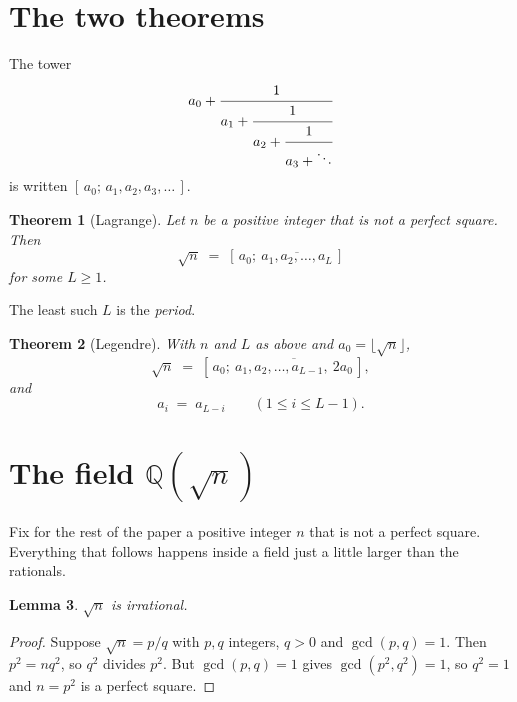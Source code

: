 \documentclass[12pt,a4paper]{article}
\theoremstyle{plain}
\newtheorem{theorem}{Theorem}
\newtheorem{lemma}[theorem]{Lemma}
\theoremstyle{definition}
\begin{document}
\clearpage
\section{The two theorems}

The tower
\[
  a_0 + \cfrac{1}{a_1 + \cfrac{1}{a_2 + \cfrac{1}{a_3 + \ddots}}}
\]
is written $[\,a_0;\, a_1, a_2, a_3, \ldots\,]$.

\begin{center}
\colorbox{yellow!25}{%
\begin{minipage}{0.93\textwidth}
\begin{theorem}[Lagrange]\label{periodic}
Let $n$ be a positive integer that is not a perfect square. Then
\[
  \sqrt n \;=\; [\,a_0;\ \overline{a_1, a_2, \ldots, a_L}\,]
\]
for some $L \geq 1$.
\end{theorem}
\end{minipage}}
\end{center}

The least such $L$ is the \emph{period}.

\begin{center}
\colorbox{yellow!25}{%
\begin{minipage}{0.93\textwidth}
\begin{theorem}[Legendre]\label{main}
With $n$ and $L$ as above and $a_0 = \lfloor\sqrt n\rfloor$,
\[
  \sqrt n \;=\; [\,a_0;\ \overline{a_1, a_2, \ldots, a_{L-1},\ 2a_0}\,],
\]
and
\[
  a_i \;=\; a_{L-i} \qquad (1 \leq i \leq L-1).
\]
\end{theorem}
\end{minipage}}
\end{center}

\section{The field $\mathbb{Q}(\sqrt n)$}

Fix for the rest of the paper a positive integer $n$ that is not a perfect
square. Everything that follows happens inside a field just a little larger
than the rationals.

\begin{lemma}\label{irrational}
$\sqrt n$ is irrational.
\end{lemma}

\begin{proof}
Suppose $\sqrt n = p/q$ with $p, q$ integers, $q > 0$ and $\gcd(p,q) = 1$.
Then $p^2 = nq^2$, so $q^2$ divides $p^2$. But $\gcd(p,q) = 1$ gives
$\gcd(p^2,q^2) = 1$, so $q^2 = 1$ and $n = p^2$ is a perfect square.
\end{proof}
\end{document}
